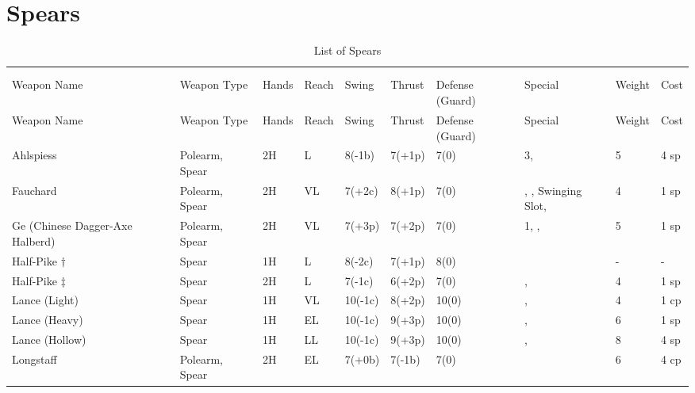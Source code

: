 \documentclass[oneside,11pt,english]{book}
\begin{document}
\section{Spears}\vspace{-15pt}
\begin{longtabu} to 1\linewidth {X[2,l] X X[-1,c] X[-1,c] XX X[-1,c] X[2,l] X[-3,c] X[-3,r]}
	\captionsetup{labelformat=blank,textformat=empty}
	\caption{List of Spears}\vspace{-15pt}\\
	\label{tab:Spears}\\
	Weapon Name						&Weapon Type			&Hands	&Reach	&Swing		&Thrust	&Defense (Guard)	&Special																	&Weight	&Cost\\\toprule\endfirsthead
Weapon Name						&Weapon Type			&Hands	&Reach	&Swing		&Thrust	&Defense (Guard)	&Special																	&Weight	&Cost\\\toprule\endhead
Ahlspiess 						&Polearm, Spear			&2H		&L		&8(-1b)		&7(+1p) &7(0)				& 3, 													&5		&4 sp\\
Fauchard 						&Polearm, Spear			&2H		&VL 	&7(+2c)		&8(+1p) &7(0)				&, , Swinging Slot,								&4		&1 sp\\
Ge (Chinese Dagger-Axe Halberd)	&Polearm, Spear			&2H		&VL 	&7(+3p)		&7(+2p) &7(0)				& 1, , 											&5		&1 sp\\
Half-Pike {$ \dagger $}						&Spear					&1H		&L		&8(-2c)		&7(+1p) &8(0)				&																&-		&-\\
Half-Pike {$ \ddagger $} 						&Spear 					&2H		&L		&7(-1c)		&6(+2p) &7(0)				&,  													&4		&1 sp\\
Lance (Light) 					&Spear 					&1H		&VL		&10(-1c)	&8(+2p) &10(0)				&,  												&4		&1 cp\\
Lance (Heavy) 					&Spear 					&1H		&EL		&10(-1c)	&9(+3p) &10(0)				&,  												&6		&1 sp\\
Lance (Hollow) 					&Spear 					&1H		&LL		&10(-1c)	&9(+3p) &10(0)				&,  												&8		&4 sp\\
Longstaff 						&Polearm, Spear			&2H		&EL		&7(+0b)		&7(-1b) &7(0)				&																&6		&4 cp\\

\end{longtabu}
\end{document}
